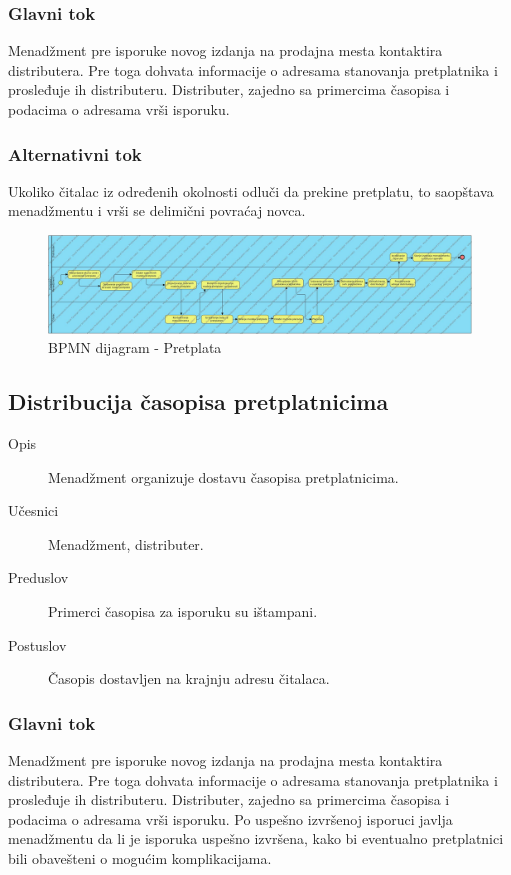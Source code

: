 \subsubsection{Glavni tok}
Menadžment pre isporuke novog izdanja na prodajna mesta kontaktira distributera. Pre toga dohvata informacije o adresama stanovanja pretplatnika i prosleđuje ih distributeru. 
Distributer, zajedno sa primercima časopisa i podacima o adresama vrši isporuku.
\subsubsection{Alternativni tok}
Ukoliko čitalac iz određenih okolnosti odluči da prekine pretplatu, to saopštava menadžmentu i vrši se delimični povraćaj novca.

\begin{figure}[ht]
    \centering
    \includegraphics[width=0.9\textheight, angle=90]{slike/pretplata}
    \caption{BPMN dijagram - Pretplata}
    \label{pretplata}
\end{figure}

\subsection{Distribucija časopisa pretplatnicima}
\begin{description}
\item [Opis] Menadžment organizuje dostavu časopisa pretplatnicima.
\item [Učesnici] Menadžment, distributer.
\item [Preduslov] Primerci časopisa za isporuku su ištampani.
\item [Postuslov] Časopis dostavljen na krajnju adresu čitalaca.
\end{description}
\subsubsection{Glavni tok}
Menadžment pre isporuke novog izdanja na prodajna mesta kontaktira distributera. Pre toga dohvata informacije o adresama stanovanja pretplatnika i prosleđuje ih distributeru. Distributer, zajedno sa primercima časopisa i podacima o adresama vrši isporuku.
Po uspešno izvršenoj isporuci javlja menadžmentu da li je isporuka uspešno izvršena, kako bi eventualno pretplatnici bili obavešteni o mogućim komplikacijama.


